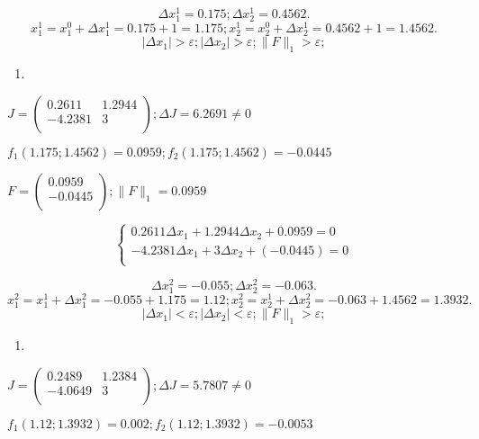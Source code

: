 \documentclass[10pt, a4paper]{scrartcl}
\begin{document}
\[\Delta x_1^1 = 0.175; \Delta x_2^1 = 0.4562.\]
\[x_1^1 = x_1^0 + \Delta x_1^1 = 0.175 + 1 = 1.175;  x_2^1 = x_2^0 + \Delta x_2^1 = 0.4562 + 1 = 1.4562.\]
\[|\Delta x_1|  >  \varepsilon ;|\Delta x_2|  >  \varepsilon ;\parallel F \parallel _1  >  \varepsilon ;\]

\begin{enumerate}
\def\labelenumi{\arabic{enumi})}
\setcounter{enumi}{1}
\item
\end{enumerate}

\(\displaystyle J = \begin{pmatrix} 0.2611 & 1.2944\\ -4.2381 & 3\\ \end{pmatrix}; \Delta J = 6.2691 \not= 0\)

\(\displaystyle f_1(1.175;1.4562) = 0.0959; f_2(1.175;1.4562) = -0.0445\)

\(\displaystyle F = \begin{pmatrix} 0.0959\\ -0.0445\\ \end{pmatrix}; \parallel F \parallel _1 = 0.0959\)

\[\begin{cases}
0.2611\Delta x_1 + 1.2944\Delta x_2 + 0.0959 = 0\\
-4.2381\Delta x_1 + 3\Delta x_2 + (-0.0445) = 0\\
\end{cases}\]

\[\Delta x_1^2 = -0.055; \Delta x_2^2 = -0.063.\]
\[x_1^2 = x_1^1 + \Delta x_1^2 = -0.055 + 1.175 = 1.12;  x_2^2 = x_2^1 + \Delta x_2^2 = -0.063 + 1.4562 = 1.3932.\]
\[|\Delta x_1|  <  \varepsilon ;|\Delta x_2|  <  \varepsilon ;\parallel F \parallel _1  >  \varepsilon ;\]

\begin{enumerate}
\def\labelenumi{\arabic{enumi})}
\setcounter{enumi}{2}
\item
\end{enumerate}

\(\displaystyle J = \begin{pmatrix} 0.2489 & 1.2384\\ -4.0649 & 3\\ \end{pmatrix}; \Delta J = 5.7807 \not= 0\)

\(\displaystyle f_1(1.12;1.3932) = 0.002; f_2(1.12;1.3932) = -0.0053\)
\end{document}
